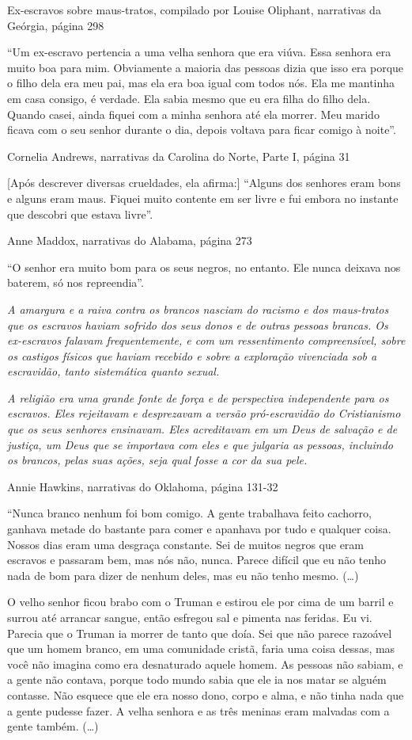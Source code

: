 Ex-escravos sobre maus-tratos, compilado por Louise Oliphant, narrativas
da Geórgia, página 298

``Um ex-escravo pertencia a uma velha senhora que era viúva. Essa
senhora era muito boa para mim. Obviamente a maioria das pessoas dizia
que isso era porque o filho dela era meu pai, mas ela era boa igual com
todos nós. Ela me mantinha em casa consigo, é verdade. Ela sabia mesmo
que eu era filha do filho dela. Quando casei, ainda fiquei com a minha
senhora até ela morrer. Meu marido ficava com o seu senhor durante o
dia, depois voltava para ficar comigo à noite''.

Cornelia Andrews, narrativas da Carolina do Norte, Parte I, página 31

{[}Após descrever diversas crueldades, ela afirma:{]} ``Alguns dos
senhores eram bons e alguns eram maus. Fiquei muito contente em ser
livre e fui embora no instante que descobri que estava livre''.

Anne Maddox, narrativas do Alabama, página 273

``O senhor era muito bom para os seus negros, no entanto. Ele nunca
deixava nos baterem, só nos repreendia''.

\emph{A amargura e a raiva contra os brancos nasciam do racismo e dos
maus-tratos que os escravos haviam sofrido dos seus donos e de outras
pessoas brancas. Os ex-escravos falavam frequentemente, e com um
ressentimento compreensível, sobre os castigos físicos que haviam
recebido e sobre a exploração vivenciada sob a escravidão, tanto
sistemática quanto sexual. }

\emph{A religião era uma grande fonte de força e de perspectiva
independente para os escravos. Eles rejeitavam e desprezavam a versão
pró-escravidão do Cristianismo que os seus senhores ensinavam. Eles
acreditavam em um Deus de salvação e de justiça, um Deus que se
importava com eles e que julgaria as pessoas, incluindo os brancos,
pelas suas ações, seja qual fosse a cor da sua pele.}

Annie Hawkins, narrativas do Oklahoma, página 131-32

``Nunca branco nenhum foi bom comigo. A gente trabalhava feito cachorro,
ganhava metade do bastante para comer e apanhava por tudo e qualquer
coisa. Nossos dias eram uma desgraça constante. Sei de muitos negros que
eram escravos e passaram bem, mas nós não, nunca. Parece difícil que eu
não tenho nada de bom para dizer de nenhum deles, mas eu não tenho
mesmo. (\ldots{})

O velho senhor ficou brabo com o Truman e estirou ele por cima de um
barril e surrou até arrancar sangue, então esfregou sal e pimenta nas
feridas. Eu vi. Parecia que o Truman ia morrer de tanto que doía. Sei
que não parece razoável que um homem branco, em uma comunidade cristã,
faria uma coisa dessas, mas você não imagina como era desnaturado aquele
homem. As pessoas não sabiam, e a gente não contava, porque todo mundo
sabia que ele ia nos matar se alguém contasse. Não esquece que ele era
nosso dono, corpo e alma, e não tinha nada que a gente pudesse fazer. A
velha senhora e as três meninas eram malvadas com a gente também.
(\ldots{})

